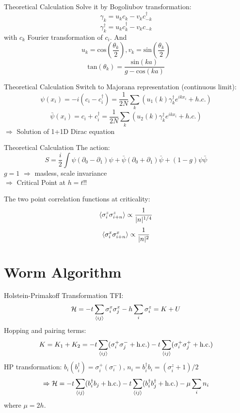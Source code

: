 \documentclass[aspectratio=43]{beamer}
\begin{document}
\begin{frame}{Theoretical Calculation}
Solve it by Bogoliubov transformation:
\[
\gamma_k=u_kc_k-v_kc_{-k}^{\dagger}
\]
\[
\gamma_k^{\dagger}=u_kc_k^{\dagger}-v_kc_{-k}
\]
with $c_k$ Fourier transformation of $c_i$. And
\[
u_k=\mathrm{cos}\left( \frac{\theta_k}{2}\right), v_k=\mathrm{sin}\left( \frac{\theta_k}{2}\right) 
\]
\[
\mathrm{tan}\left(\theta_k\right)=\frac{\mathrm{sin}(ka)}{g-\mathrm{cos}(ka)}
\]
\end{frame}

\begin{frame}{Theoretical Calculation}
Switch to Majorana representation (continuous limit):
\[
\psi(x_i)=-i(c_i-c_i^{\dagger})=\frac{1}{2N}\sum_k(u_1(k)\gamma_k^{\dagger}e^{ikx_i}+h.c.)
\]
\[
\bar{\psi}(x_i)=c_i+c_i^{\dagger}=\frac{1}{2N}\sum_k(u_2(k)\gamma_k^{\dagger}e^{ikx_i}+h.c.)
\]
$\Longrightarrow$ Solution of 1+1D Dirac equation
\end{frame}

\begin{frame}{Theoretical Calculation}
The action:
\[
S=\frac{i}{2}\int\psi(\partial_0-\partial_1)\psi+\bar{\psi}(\partial_0+\partial_1)\bar{\psi}+(1-g)\psi\bar{\psi}
\]
$g=1$ $\Longrightarrow$ masless, scale invariance 
\[
\]
$\Longrightarrow$ Critical Point at $h=t$!!
\end{frame}

\begin{frame}
The two point correlation functions at criticality:
\[
\braket{\sigma_i^z\sigma_{i+n}^z}\propto\frac{1}{|n|^{1/4}}
\]
\[
\braket{\sigma_i^x\sigma_{i+n}^x}\propto\frac{1}{|n|^2}
\]
\end{frame}

\section{Worm Algorithm}
\begin{frame}{Holstein-Primakoff Transformation}
  TFI:
  \[
    \mathcal{H} = -t\sum_{\braket{ij}}\sigma_i^x\sigma_j^x - h\sum_{i}\sigma_i^z = K+U
  \]
  Hopping and pairing terms:
  \[
    K = K_1+K_2 = -t\sum_{\braket{ij}}(\sigma_i^+\sigma_j^-+\text{h.c.})-t\sum_{\braket{ij}}(\sigma_i^+\sigma_j^++\text{h.c.})
  \]
  HP transformation: $b_i(b_i^\dag) = \sigma_i^+(\sigma_i^-)$, $n_i = b_i^\dag b_i = (\sigma_i^z+1)/2$
  \[
    \Rightarrow \mathcal{H} = -t\sum_{\braket{ij}}(b_i^\dag b_j+\text{h.c.})-t\sum_{\braket{ij}}(b_i^\dag b_j^\dag+\text{h.c.})-\mu\sum_{i}n_i
  \]
  where $\mu = 2h$.
\end{frame}
\end{document}

